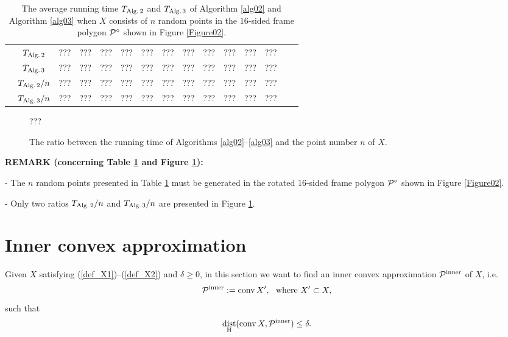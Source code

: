 \documentclass[12pt]{article}
\newcommand{\red}[1]{{\color{red} #1 }}
\DeclareMathOperator{\conv}{conv}
\DeclareMathOperator{\dist}{dist}
\begin{document}
\begin{table}[ht]
\begin{center}
\begin{tabular}{|c|c||c|c|c|c|c|c|c|c|c|c|c|c|c|}
        & $T_{\rm Alg.\, 2}$  &   ???& ???& ???& ???& ???& ???& ???& ???& ???& ???& ??? \\
        
        & $T_{\rm Alg.\, 3}$  &   ???& ???& ???& ???& ???& ???& ???& ???& ???& ???& ??? \\
		
		& $T_{\rm Alg.\, 2}/n$  &   ???& ???& ???& ???& ???& ???& ???& ???& ???& ???& ??? \\
		
		& $T_{\rm Alg.\, 3}/n$& ???& ???& ???& ???& ???& ???& ???& ???& ???& ???& ???   \\
		\hline
	\end{tabular}
		\caption{The average running time $T_{\rm Alg.\, 2}$ and $T_{\rm Alg.\, 3}$ of Algorithm \ref{alg02} and Algorithm \ref{alg03}
when $X$ consists of $n$ random points in the $16$-sided frame polygon ${\cal P}^\diamond$ shown in Figure \ref{Figure02}.}
		\label{table02}
	\end{center}
\end{table} 	

\begin{figure}[ht]
	\centering
	???
	\caption{The ratio between the running time of Algorithms \ref{alg02}--\ref{alg03} and the point number $n$ of $X$.}
	\label{Figure03}
\end{figure}


\red{
\bigskip\noindent
{\bf REMARK (concerning Table \ref{table02} and Figure \ref{Figure03}):} 

 - The $n$ random points presented in Table \ref{table02} must be generated in the rotated 16-sided frame polygon ${\cal P}^\diamond$ shown in Figure \ref{Figure02}.
 
 - Only two ratios $T_{\rm Alg.\, 2}/n$ and $T_{\rm Alg.\, 3}/n$ are presented in Figure \ref{Figure03}.

\bigskip
} 




\section{Inner convex approximation}\label{InnerConvexApproximation}

Given $X$ satisfying (\ref{def_X1})--(\ref{def_X2}) and $\delta \geq 0$,
in this section we want to find an inner convex approximation ${\cal P}^{\rm inner}$  of $X$, i.e.
\begin{equation}\label{def_calPinner-1}
{\cal P}^{\rm inner} := \conv X', \ \mbox{ where } X' \subset X,
\end{equation}
such that
\begin{equation}\label{def_calPinner-2}
\dist_{\rm H}(\conv X, {\cal P}^{\rm inner}) \leq \delta.
\end{equation}
\end{document}
